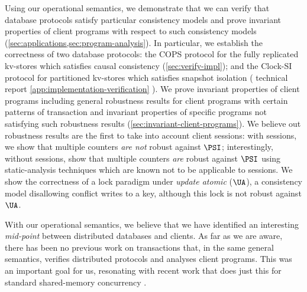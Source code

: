 Using our operational semantics, we demonstrate that we can verify
that database protocols satisfy particular consistency models and
prove invariant properties of client programs with respect to such
consistency models (\cref{sec:applications,sec:program-analysis}).
In particular, we establish the correctness of two database
protocols: the COPS protocol for the fully replicated kv-stores \cite{cops} 
which satisfies causal consistency (\cref{sec:verify-impl}); 
and the Clock-SI protocol for partitioned kv-stores \cite{clocksi} 
which satisfies snapshot isolation 
(%
\ifTechRepEdits%
technical report%
\else%
\cref{app:implementation-verification}%
\fi%
). 
We prove invariant properties of client programs including general robustness results
for client programs with certain patterns of transaction and
invariant properties of specific programs not satisfying 
such robustness results (\cref{sec:invariant-client-programs}). 
We believe out robustness results are the first to take into account client
sessions: with sessions, we show that multiple counters {\em are not} robust against \(\PSI\);
interestingly, without sessions, \citet{giovanni_concur16} show that multiple counters {\em are}
robust against \(\PSI\) using static-analysis techniques which are
known not to be applicable to sessions.  
We show the correctness of a lock paradigm under \emph{update atomic} (\( \UA \)),
a consistency model disallowing conflict writes to a key,
although this lock is not robust against \( \UA \).

With our operational semantics, we believe that we have identified an interesting \emph{mid-point}
between distributed databases and clients.
As far as we are aware, there has been no previous work on transactions
that, in the same general semantics, verifies distributed protocols and analyses client programs. 
This was an important goal for us, resonating with recent work
that does just this for standard shared-memory concurrency \cite{cap,tada,iris,fcsl}. 

